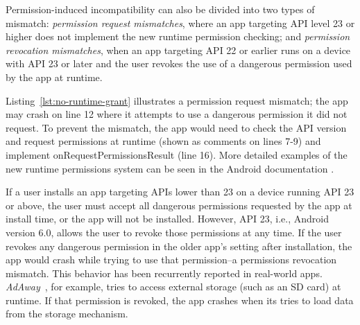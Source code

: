 \begin{figure}[b]%
     
\end{figure}

Permission-induced incompatibility can also be divided into
two types of mismatch: {\it permission request mismatches},
where an app targeting API level 23 or higher does not
implement the new runtime permission checking; and {\it
permission revocation mismatches}, when an app targeting API
22 or earlier runs on a device with API 23 or later and the 
user revokes the use of a dangerous permission used by 
the app at runtime.
 

Listing~\ref{lst:no-runtime-grant} illustrates a permission
request mismatch; the app may crash on line 12 where it
attempts to use a dangerous permission it did not request.
To prevent the mismatch, the app would need to check the API
version and request permissions at runtime (shown as
comments on lines 7-9) and implement {\sf
onRequestPermissionsResult} (line 16). More detailed
examples of the new runtime permissions system can be seen
in the Android documentation \cite{runtimepermissions}.


If a user installs an app targeting APIs lower than 23 on a
device running API 23 or above, the user must accept all
dangerous permissions requested by the app at install time,
or the app will not be installed. However, API 23, 
i.e., Android version 6.0, allows the user to revoke those permissions
at any time. If the user revokes any dangerous permission in
the older app's setting after installation, the app would
crash while trying to use that permission--a permissions
revocation mismatch. This behavior has been recurrently
reported in real-world apps. \textit{AdAway}~\cite{adaway},
for example, tries to access external storage (such as an SD
card) at runtime. If that permission is revoked, the app
crashes when its tries to load data from the storage
mechanism.

